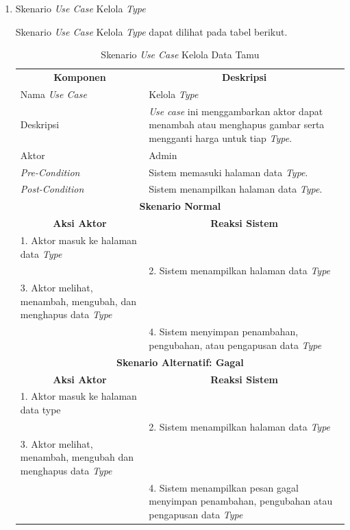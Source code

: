 \begin{enumerate}[label=\alph*.]
    
    \item Skenario \textit{Use Case} Kelola \textit{Type}

\par Skenario \textit{Use Case} Kelola \textit{Type} dapat dilihat pada tabel berikut.
        
        \begin{longtable}{|p{5cm}|p{9cm}|}
	    \captionsetup{position=above} %
	    \caption{Skenario \textit{Use Case} Kelola Data Tamu}
	    \label{tab:my-table} \\ \hline
	    \multicolumn{1}{|c|}{\textbf{Komponen}} & \multicolumn{1}{c|}{\textbf{Deskripsi}} \\ \hline
	    \endfirsthead
	    \endhead
	    Nama \textit{Use Case} & Kelola \textit{Type} \\ \hline
	    Deskripsi & \textit{Use case} ini menggambarkan aktor dapat menambah atau menghapus gambar serta mengganti harga untuk tiap \textit{Type}. \\ \hline
	    Aktor & Admin \\ \hline
	    \textit{Pre-Condition} & Sistem memasuki halaman data \textit{Type}. \\ \hline
	    \textit{Post-Condition} & Sistem menampilkan halaman data \textit{Type}. \\ \hline
	    \multicolumn{2}{|c|}{\textbf{Skenario Normal}} \\ \hline
	    \multicolumn{1}{|c|}{\textbf{Aksi Aktor}} & \multicolumn{1}{c|}{\textbf{Reaksi Sistem}} \\ \hline
	    1. Aktor masuk ke halaman data \textit{Type} & \\ \hline
	    & 2. Sistem menampilkan halaman data \textit{Type} \\ \hline
	    3. Aktor melihat, menambah, mengubah, dan menghapus data \textit{Type} & \\ \hline
	    & 4. Sistem menyimpan penambahan, pengubahan, atau pengapusan data \textit{Type} \\ \hline
	    \multicolumn{2}{|c|}{\textbf{Skenario Alternatif: Gagal}} \\ \hline
	    \multicolumn{1}{|c|}{\textbf{Aksi Aktor}} & \multicolumn{1}{c|}{\textbf{Reaksi Sistem}} \\ \hline
	    1. Aktor masuk ke halaman data type & \\ \hline
	    & 2. Sistem menampilkan halaman data \textit{Type} \\ \hline
	    3. Aktor melihat, menambah, mengubah dan menghapus data \textit{Type} & \\ \hline
	    & 4. Sistem menampilkan pesan gagal menyimpan penambahan, pengubahan atau pengapusan data \textit{Type} \\ \hline
	\end{longtable}
  

\end{enumerate}
